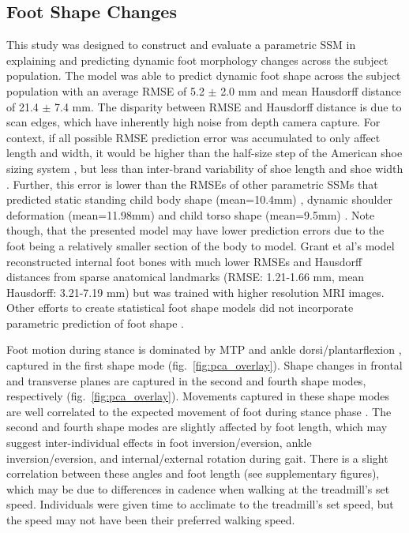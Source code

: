 \documentclass[defaultstyle,11pt]{comps}
\begin{document}
\hypertarget{foot-shape-changes}{%
\subsection{Foot Shape Changes}\label{foot-shape-changes}}

This study was designed to construct and evaluate a parametric SSM in explaining and predicting dynamic foot morphology changes across the subject population.
The model was able to predict dynamic foot shape across the subject population with an average RMSE of 5.2 \(\pm\) 2.0 mm and mean Hausdorff distance of 21.4 \(\pm\) 7.4 mm.
The disparity between RMSE and Hausdorff distance is due to scan edges, which have inherently high noise from depth camera capture.
For context, if all possible RMSE prediction error was accumulated to only affect length and width, it would be higher than the half-size step of the American shoe sizing system \citep{Luximon2013}, but less than inter-brand variability of shoe length and shoe width \citep{Wannop2019}.
Further, this error is lower than the RMSEs of other parametric SSMs that predicted static standing child body shape (mean=10.4mm) \citep{Park2015a}, dynamic shoulder deformation (mean=11.98mm) \citep{Kim2016} and child torso shape (mean=9.5mm) \citep{Park2017}.
Note though, that the presented model may have lower prediction errors due to the foot being a relatively smaller section of the body to model.
Grant et al's model reconstructed internal foot bones with much lower RMSEs and Hausdorff distances from sparse anatomical landmarks (RMSE: 1.21-1.66 mm, mean Hausdorff: 3.21-7.19 mm) \citep{Grant2020} but was trained with higher resolution MRI images.
Other efforts to create statistical foot shape models did not incorporate parametric prediction of foot shape \citep{Conrad2019, Stankovic2020}.

Foot motion during stance is dominated by MTP and ankle dorsi/plantarflexion \citep{Leardini2007}, captured in the first shape mode (fig.~\ref{fig:pca_overlay}).
Shape changes in frontal and transverse planes are captured in the second and fourth shape modes, respectively (fig.~\ref{fig:pca_overlay}).
Movements captured in these shape modes are well correlated to the expected movement of foot during stance phase \citep{Leardini2007}.
The second and fourth shape modes are slightly affected by foot length, which may suggest inter-individual effects in foot inversion/eversion, ankle inversion/eversion, and internal/external rotation during gait.
There is a slight correlation between these angles and foot length (see supplementary figures), which may be due to differences in cadence when walking at the treadmill's set speed.
Individuals were given time to acclimate to the treadmill's set speed, but the speed may not have been their preferred walking speed.
\end{document}
